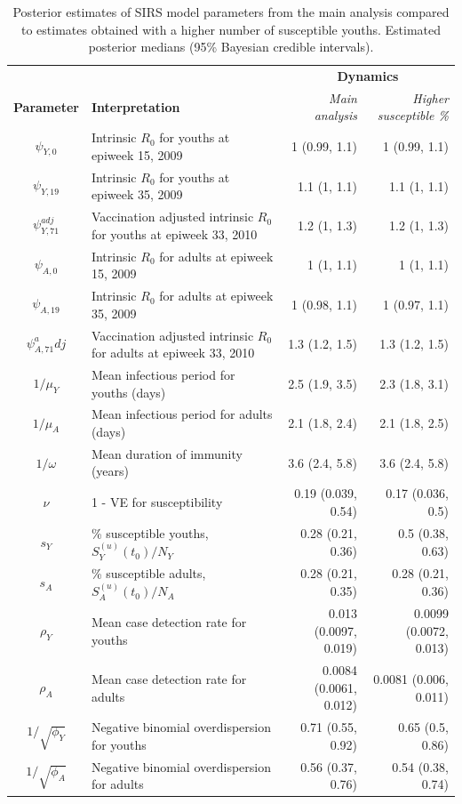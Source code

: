 \begin{table}
	\caption[Posterior estimates of SIRS model parameters for pandemic A(H1N1) influenza in Finland --- Sensitivity analysis to prior distribution for the effective population size.]{Posterior estimates of SIRS model parameters from the main analysis compared to estimates obtained with a higher number of susceptible youths. Estimated posterior medians (95\% Bayesian credible intervals).} 
	\label{tab:flu_param_ests_sensitivity}
	\centering\footnotesize
	\begin{tabular}{clrr}
		\hline
		&&\multicolumn{2}{c}{\textbf{Dynamics}}\\
		\cmidrule{3-4}\textbf{Parameter} & \textbf{Interpretation} & \textit{Main analysis} & \textit{Higher susceptible \%}\\
		\hline
		$ \psi_{Y,0} $ & Intrinsic $ R_0 $ for youths at epiweek 15, 2009  & 1 (0.99, 1.1) & 1 (0.99, 1.1)\\
		$ \psi_{Y,19} $ & Intrinsic $ R_0 $ for youths at epiweek 35, 2009 & 1.1 (1, 1.1) & 1.1 (1, 1.1)\\
		$ \psi_{Y,71}^{adj} $ & Vaccination adjusted intrinsic $ R_0 $ for youths at epiweek 33, 2010 & 1.2 (1, 1.3) & 1.2 (1, 1.3)\\
		$ \psi_{A,0} $ & Intrinsic $ R_0 $ for adults at epiweek 15, 2009  & 1 (1, 1.1) & 1 (1, 1.1)\\
		$ \psi_{A,19} $ & Intrinsic $ R_0 $ for adults at epiweek 35, 2009 & 1 (0.98, 1.1) & 1 (0.97, 1.1)\\
		$ \psi_{A,71}^adj $ & Vaccination adjusted intrinsic $ R_0 $ for adults at epiweek 33, 2010 & 1.3 (1.2, 1.5) & 1.3 (1.2, 1.5)\\
		$ 1/\mu_{Y} $ & Mean infectious period for youths (days) & 2.5 (1.9, 3.5) & 2.3 (1.8, 3.1)\\
		$ 1/\mu_A $ & Mean infectious period for adults (days) & 2.1 (1.8, 2.4) & 2.1 (1.8, 2.5)\\
		$ 1/\omega $ & Mean duration of immunity (years) & 3.6 (2.4, 5.8) & 3.6 (2.4, 5.8)\\
		$ \nu $ & 1 - VE for susceptibility & 0.19 (0.039, 0.54) & 0.17 (0.036, 0.5)\\
		$ s_Y $ & \% susceptible youths, $ S^{(u)}_Y(t_0) / N_Y $ & 0.28 (0.21, 0.36) & 0.5 (0.38, 0.63)\\
		$ s_A $ & \% susceptible adults, $ S_A^{(u)}(t_0) / N_A $ & 0.28 (0.21, 0.35) & 0.28 (0.21, 0.36)\\
		$ \rho_Y $ & Mean case detection rate for youths & 0.013 (0.0097, 0.019) & 0.0099 (0.0072, 0.013)\\
		$ \rho_A $ & Mean case detection rate for adults & 0.0084 (0.0061, 0.012) & 0.0081 (0.006, 0.011)\\		
		$ 1/\sqrt{\phi_Y} $ & Negative binomial overdispersion for youths & 0.71 (0.55, 0.92) & 0.65 (0.5, 0.86)\\
		$ 1/\sqrt{\phi_A} $ & Negative binomial overdispersion for adults & 0.56 (0.37, 0.76) & 0.54 (0.38, 0.74)\\
		\hline
	\end{tabular}
\end{table}